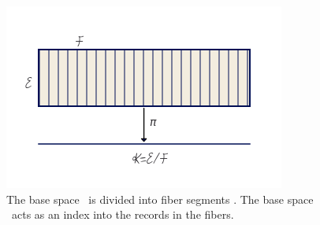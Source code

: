 \documentclass[../main.tex]{subfiles}
\begin{document}
\begin{figure}[H]
    \includegraphics[width=\linewidth]{figures/math/k_qspace.png}
    \caption{The base space \dtotal\ is divided into fiber segments \dfiber. The base space \dbase\ acts as an index into the records in the fibers.}
    \label{fig:base_space_div}
\end{figure}
\end{document}
